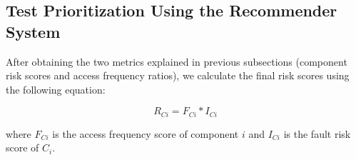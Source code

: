 	

\vspace*{-3pt}
\subsection{Test Prioritization Using the Recommender System}
\label{test-prioritization}

After obtaining the two metrics explained in previous subsections (component risk scores and 
access frequency ratios), we calculate the final risk scores using the following equation:

\vspace*{-3pt}
\[
{ R_{Ci} = F_{Ci} * I_{Ci}}	
\]

\vspace*{-3pt}
where $F_{Ci}$ is the access frequency score of component $i$ 
and $I_{Ci}$ is the fault risk score of $C_i$.  


